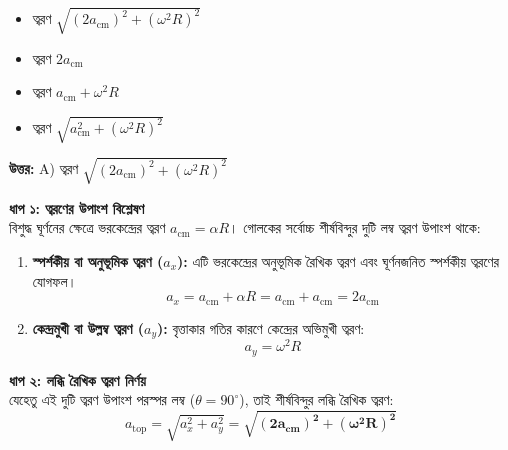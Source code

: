 \documentclass[12pt, a4paper]{article}
\begin{document}
\begin{itemize}[label={}, leftmargin=1cm, itemsep=0.5em]
    \item[\textbf{A)}] ত্বরণ $\sqrt{(2a_{\text{cm}})^2 + (\omega^2 R)^2}$
    \item[\textbf{B)}] ত্বরণ $2a_{\text{cm}}$
    \item[\textbf{C)}] ত্বরণ $a_{\text{cm}} + \omega^2 R$
    \item[\textbf{D)}] ত্বরণ $\sqrt{a_{\text{cm}}^2 + (\omega^2 R)^2}$
\end{itemize}

\vspace{0.5em}
\begin{tcolorbox}[answerbox]
    \textbf{\color{success} উত্তর:} A) ত্বরণ $\sqrt{(2a_{\text{cm}})^2 + (\omega^2 R)^2}$
\end{tcolorbox}
\vspace{1em}

\begin{tcolorbox}[solutionbox={সমাধান (Solution)}]
    \noindent
    \textbf{ধাপ ১: ত্বরণের উপাংশ বিশ্লেষণ} \\
    বিশুদ্ধ ঘূর্ণনের ক্ষেত্রে ভরকেন্দ্রের ত্বরণ $a_{\text{cm}} = \alpha R$। গোলকের সর্বোচ্চ শীর্ষবিন্দুর দুটি লম্ব ত্বরণ উপাংশ থাকে:
    
    \begin{enumerate}[topsep=0pt, itemsep=2pt]
        \item \textbf{স্পর্শকীয় বা অনুভূমিক ত্বরণ ($a_x$):} এটি ভরকেন্দ্রের অনুভূমিক রৈখিক ত্বরণ এবং ঘূর্ণনজনিত স্পর্শকীয় ত্বরণের যোগফল।
        \[ a_x = a_{\text{cm}} + \alpha R = a_{\text{cm}} + a_{\text{cm}} = 2a_{\text{cm}} \]
        \item \textbf{কেন্দ্রমুখী বা উল্লম্ব ত্বরণ ($a_y$):} বৃত্তাকার গতির কারণে কেন্দ্রের অভিমুখী ত্বরণ:
        \[ a_y = \omega^2 R \]
    \end{enumerate}
    
    \vspace{0.5em}
    \noindent\textbf{ধাপ ২: লব্ধি রৈখিক ত্বরণ নির্ণয়} \\
    যেহেতু এই দুটি ত্বরণ উপাংশ পরস্পর লম্ব ($\theta = 90^\circ$), তাই শীর্ষবিন্দুর লব্ধি রৈখিক ত্বরণ:
    \[ a_{\text{top}} = \sqrt{a_x^2 + a_y^2} = \mathbf{\sqrt{(2a_{\text{cm}})^2 + (\omega^2 R)^2}} \]
\end{tcolorbox}
\end{document}

